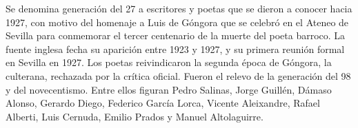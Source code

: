 \documentclass{book}
\begin{document}
Se denomina generación del 27 a escritores y poetas que se dieron a conocer hacia 1927, con motivo del homenaje a Luis de Góngora que se celebró en el Ateneo de Sevilla para conmemorar el tercer centenario de la muerte del poeta barroco. La fuente inglesa fecha su aparición entre 1923 y 1927, y su primera reunión formal en Sevilla en 1927. Los poetas reivindicaron la segunda época de Góngora, la culterana, rechazada por la crítica oficial. Fueron el relevo de la generación del 98 y del novecentismo. Entre ellos figuran Pedro Salinas, Jorge Guillén, Dámaso Alonso, Gerardo Diego, Federico García Lorca, Vicente Aleixandre, Rafael Alberti, Luis Cernuda, Emilio Prados y Manuel Altolaguirre.

\end{document}
